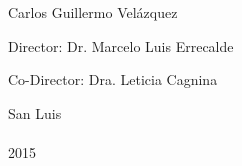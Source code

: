 \begin{center}
{\Large Carlos Guillermo Velázquez}\\

\vspace{2cm}

\begin{flushleft}

\hspace{2.5cm} {\Large Director: Dr. Marcelo Luis Errecalde}

\hspace{2.5cm} {\Large Co-Director: Dra. Leticia Cagnina}

\vspace{2cm}

\end{flushleft}

{\Large {\sc San Luis}\hspace{5cm}{\sc Argentina}}\\
\ \\
{\Large 2015}\

\end{center}



\break
